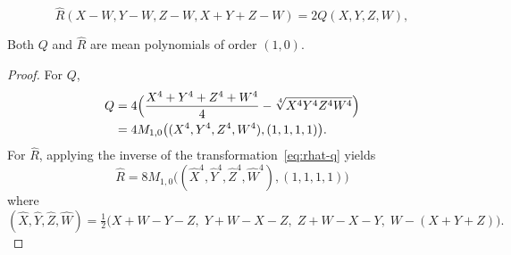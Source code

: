 \documentclass[10pt,a4paper]{amsart}
\begin{document}
\begin{equation}\label{eq:rhat-q}
\hat{R}(X-W,Y-W,Z-W,X+Y+Z-W)=2Q(X,Y,Z,W),
\end{equation}

\begin{prop}\label{prop:cl-rob}
Both $Q$ and $\hat{R}$ are mean polynomials of order $(1,0)$.
\end{prop}

\begin{proof}
For $Q$,
\begin{align*}
Q&=4\Bigl(\frac{X^4+Y^4+Z^4+W^4}{4}-\sqrt[4]{X^4Y^4Z^4W^4}\Bigr)\\
&=4M_{1,0}\bigl((X^4,Y^4,Z^4,W^4),(1,1,1,1)\bigr).
\end{align*}
For $\hat{R}$, applying the inverse of the transformation~\eqref{eq:rhat-q}
yields
\[
\hat{R}=8M_{1,0}\bigl((\hat{X}^4,\hat{Y}^4,\hat{Z}^4,\hat{W}^4),(1,1,1,1)\bigr)
\]
where
\[
(\hat{X},\hat{Y},\hat{Z},\hat{W})=\tfrac12\bigl(
X+W-Y-Z,\;Y+W-X-Z,\;Z+W-X-Y,\;W-(X+Y+Z)\bigr).
\]
\end{proof}
\end{document}
